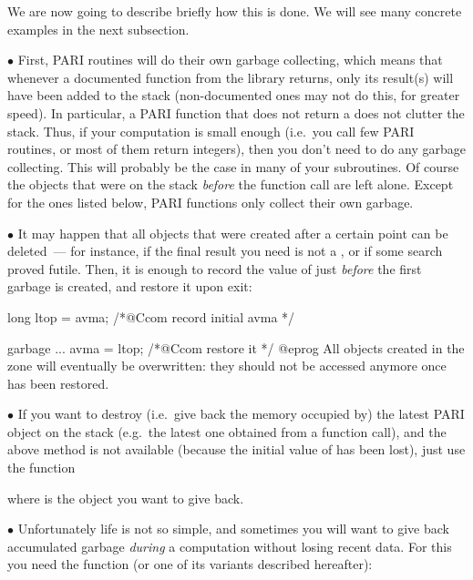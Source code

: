 We are now going to describe briefly how this is done. We will see many
concrete examples in the next subsection.

\noindent$\bullet$
First, PARI routines will do their own garbage collecting, which
means that whenever a documented function from the library returns, only its
result(s) will have been added to the stack (non-documented ones may not do
this, for greater speed). In particular, a PARI function that does not return
a  does not clutter the stack. Thus, if your computation is small
enough (i.e.~you call few PARI routines, or most of them return 
integers), then you don't need to do any garbage collecting. This will probably
be the case in many of your subroutines. Of course the objects that were on
the stack {\it before\/} the function call are left alone. Except for the ones
listed below, PARI functions only collect their own garbage.

\noindent$\bullet$
It may happen that all objects that were created after a certain point can
be deleted~--- for instance, if the final result you need is not a
, or if some search proved futile. Then, it is enough to record
the value of  just {\it before\/} the first garbage is created,
and restore it upon exit:

\bprog
long ltop = avma; /*@Ccom record initial avma */

garbage ...
avma = ltop; /*@Ccom restore it */
@eprog
\noindent All objects created in the  zone will eventually
be overwritten: they should not be accessed anymore once  has been
restored.

\noindent$\bullet$
If you want to destroy (i.e.~give back the memory occupied by) the
latest PARI object on the stack (e.g.~the latest one obtained from a function
call), and the above method is not available (because the initial value of
 has been lost), just use the function%


\noindent where  is the object you want to give back.

\noindent$\bullet$
Unfortunately life is not so simple, and sometimes you will want
to give back accumulated garbage {\it during\/} a computation without losing
recent data. For this you need the  function (or one of its
variants described hereafter):


